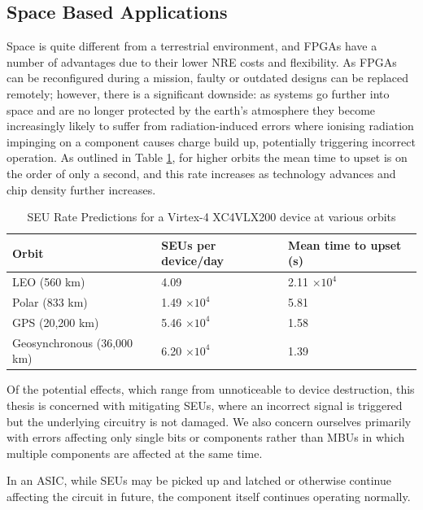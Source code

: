 \documentclass[12pt,final,oneside]{dwThesis} %
\begin{document}
   \subsection{Space Based Applications} Space is quite different from a
   terrestrial environment, and \glspl{FPGA} have a number of advantages due to
   their lower \gls{NRE} costs and flexibility. As \glspl{FPGA} can be
   reconfigured during a mission, faulty or outdated designs can be replaced
   remotely; however, there is a significant downside: as systems go further
   into space and are no longer protected by the earth's atmosphere they become
   increasingly likely to suffer from radiation-induced errors where ionising
   radiation impinging on a component causes charge build up, potentially
   triggering incorrect operation\cite{SEEMechanism}. As outlined in Table
   \ref{SEURate}, for higher orbits the mean time to upset is on the order of
   only a second, and this rate increases as technology advances and chip
   density further increases.  \begin{table} \begin{center}
         \begin{tabular}{lll} \toprule Orbit & SEUs per device/day &Mean time
            to upset (s)\\ \midrule LEO (560 km) & 4.09 & 2.11 $\times 10^4$\\
            Polar (833 km) & 1.49 $\times 10^4$ & 5.81\\ GPS (20,200 km) & 5.46
            $\times 10^4$ & 1.58\\ Geosynchronous (36,000 km) & 6.20 $\times
            10^4$ & 1.39\\ \bottomrule \end{tabular} \caption{SEU Rate
            Predictions for a Virtex-4 XC4VLX200 device at various
            orbits\cite{DiesselChange}} \label{SEURate} \end{center}
   \end{table} Of the potential effects, which range from unnoticeable to
   device destruction, this thesis is concerned with mitigating \glspl{SEU},
   where an incorrect signal is triggered but the underlying circuitry is not
   damaged. We also concern ourselves primarily with errors affecting only
   single bits or components rather than \glspl{MBU} in which multiple
   components are affected at the same time.

   In an \gls{ASIC}, while \glspl{SEU} may be picked up and latched or
   otherwise continue affecting the circuit in future, the component itself
   continues operating normally.
\end{document}
